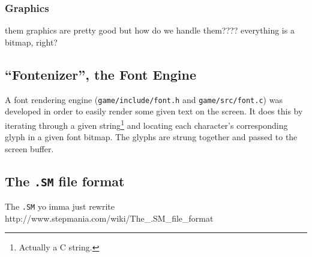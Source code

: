 	\subsubsection{Graphics}
		them graphics are pretty good but how do we handle them????
		everything is a bitmap, right?
\subsection{``Fontenizer'', the Font Engine}
	A font rendering engine (\texttt{game/include/font.h} and \texttt{game/src/font.c}) was developed in order to easily render some given text on the screen.
	It does this by iterating through a given string\footnote{Actually a C string.} and locating each character's corresponding glyph in a given font bitmap.
	The glyphs are strung together and passed to the screen buffer.

\subsection{The \texttt{.SM} file format}
	The \texttt{.SM}
	yo imma just rewrite http://www.stepmania.com/wiki/The_.SM_file_format
